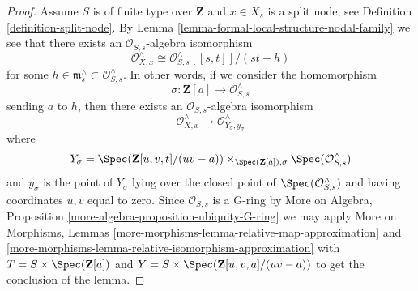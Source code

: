 \begin{proof}
\medskip\noindent
Assume $S$ is of finite type over $\mathbf{Z}$ and
$x \in X_s$ is a split node, see Definition \ref{definition-split-node}.
By Lemma \ref{lemma-formal-local-structure-nodal-family} we see that there
exists an $\mathcal{O}_{S, s}$-algebra isomorphism
$$
\mathcal{O}_{X, x}^\wedge \cong
\mathcal{O}_{S, s}^\wedge[[s, t]]/(st - h)
$$
for some $h \in \mathfrak m_s^\wedge \subset \mathcal{O}_{S, s}^\wedge$.
In other words, if we consider the homomorphism
$$
\sigma : \mathbf{Z}[a] \longrightarrow \mathcal{O}_{S, s}^\wedge
$$
sending $a$ to $h$, then there exists an $\mathcal{O}_{S, s}$-algebra
isomorphism
$$
\mathcal{O}_{X, x}^\wedge
\longrightarrow
\mathcal{O}_{Y_\sigma, y_\sigma}^\wedge
$$
where
$$
Y_\sigma = \Spec(\mathbf{Z}[u, v, t]/(uv - a))
\times_{\Spec(\mathbf{Z}[a]), \sigma} \Spec(\mathcal{O}_{S, s}^\wedge)
$$
and $y_\sigma$ is the point of $Y_\sigma$ lying over
the closed point of $\Spec(\mathcal{O}_{S, s}^\wedge)$
and having coordinates $u, v$ equal to zero. Since
$\mathcal{O}_{S, s}$ is a G-ring by
More on Algebra, Proposition \ref{more-algebra-proposition-ubiquity-G-ring}
we may apply More on Morphisms, Lemmas
\ref{more-morphisms-lemma-relative-map-approximation} and
\ref{more-morphisms-lemma-relative-isomorphism-approximation}
with $T = S \times \Spec(\mathbf{Z}[a])$ and
$Y = S \times \Spec(\mathbf{Z}[u, v, a]/(uv -a))$
to get the conclusion of the lemma.
\end{proof}












